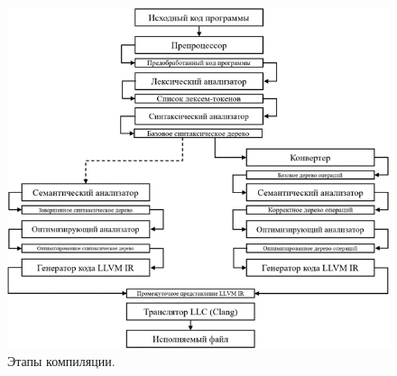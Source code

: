 \newpage
\begin{figure}[h]
    \centering
    \includegraphics[width=\textwidth]{images/compilation-pipeline.png}
    \caption{Этапы компиляции.}
    \label{fig:compilation_pipeline}
\end{figure}
